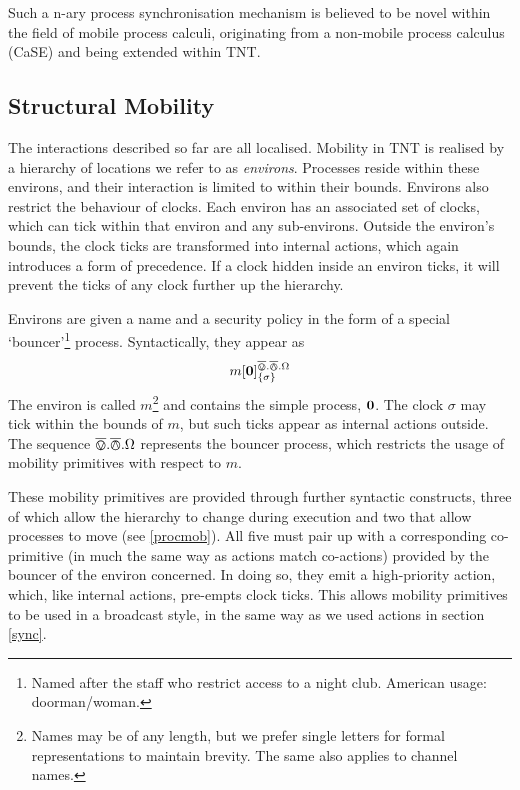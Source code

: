 \documentclass{acm_proc_article-sp}
\begin{document}
Such a n-ary process synchronisation mechanism is believed to be novel
within the field of mobile process calculi, originating from a
non-mobile process calculus (CaSE) and being extended within TNT.

\subsection{Structural Mobility}
\label{structmob}

The interactions described so far are all localised.  Mobility in TNT is
realised by a hierarchy of locations we refer to as \emph{environs}.
Processes reside within these environs, and their interaction is limited
to within their bounds.  Environs also restrict the behaviour of clocks.
Each environ has an associated set of clocks, which can tick within that
environ and any sub-environs.  Outside the environ's bounds, the clock
ticks are transformed into internal actions, which again introduces a
form of precedence.  If a clock hidden inside an environ ticks, it will
prevent the ticks of any clock further up the hierarchy.

Environs are given a name and a security policy in the form of a special
`bouncer'\footnote{Named after the staff who restrict access to a night
club.  American usage: doorman/woman.} process.  Syntactically, they
appear as
\begin{displaymath}
{m}[ \textbf{0} ]^{\overline{\varovee}.\overline{\varowedge}.\Omega}_{\{\sigma\}}
\end{displaymath}
The environ is called $m$\footnote{Names may be of any length, but we
 prefer single letters for formal representations to maintain brevity.
 The same also applies to channel names.} and contains the simple
 process, $\textbf{0}$.  The clock $\sigma$ may tick within the bounds of $m$,
 but such ticks appear as internal actions outside.  The sequence
 $\overline{\varovee}.\overline{\varowedge}.\Omega$ represents the bouncer process, which restricts the
 usage of mobility primitives with respect to $m$.

These mobility primitives are provided through further syntactic
 constructs, three of which allow the hierarchy to change during
 execution and two that allow processes to move (see \ref{procmob}).
 All five must pair up with a corresponding co-primitive (in much the
 same way as actions match co-actions) provided by the bouncer of the
 environ concerned.  In doing so, they emit a high-priority action,
 which, like internal actions, pre-empts clock ticks.  This allows
 mobility primitives to be used in a broadcast style, in the same way as
 we used actions in section \ref{sync}.
\end{document}
